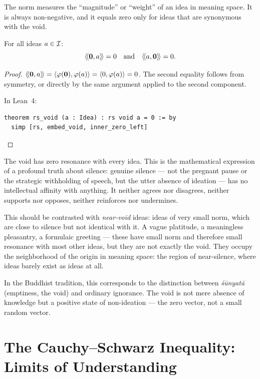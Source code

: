 The norm measures the ``magnitude'' or ``weight'' of an idea in meaning space.
It is always non-negative, and it equals zero only for ideas that are synonymous
with the void.

\begin{theorem}
\label{thm:void-zero-resonance}
For all ideas $a \in \mathcal{I}$:
\[
  \langle\!\langle \mathbf{0}, a \rangle\!\rangle = 0 \quad \text{and} \quad \langle\!\langle a, \mathbf{0} \rangle\!\rangle = 0.
\]
\end{theorem}

\begin{proof}
$\langle\!\langle \mathbf{0}, a \rangle\!\rangle = \langle \varphi(\mathbf{0}), \varphi(a) \rangle = \langle 0, \varphi(a) \rangle = 0$.
The second equality follows from symmetry, or directly by the same argument
applied to the second component.

In Lean~4:
\begin{lstlisting}
theorem rs_void (a : Idea) : rs void a = 0 := by
  simp [rs, embed_void, inner_zero_left]
\end{lstlisting}
\end{proof}

\begin{interpretation}
\label{interp:silence-resonance}
The void has zero resonance with every idea. This is the mathematical expression
of a profound truth about silence: genuine silence --- not the pregnant pause or
the strategic withholding of speech, but the utter absence of ideation --- has
no intellectual affinity with anything. It neither agrees nor disagrees,
neither supports nor opposes, neither reinforces nor undermines.

This should be contrasted with \emph{near-void} ideas: ideas of very small norm,
which are close to silence but not identical with it. A vague platitude, a
meaningless pleasantry, a formulaic greeting --- these have small norm and
therefore small resonance with most other ideas, but they are not exactly the
void. They occupy the neighborhood of the origin in meaning space: the region
of near-silence, where ideas barely exist as ideas at all.

In the Buddhist tradition, this corresponds to the distinction between
\emph{\'s\=unyat\=a} (emptiness, the void) and ordinary ignorance. The void is
not mere absence of knowledge but a positive state of non-ideation --- the zero
vector, not a small random vector.
\end{interpretation}


\section{The Cauchy--Schwarz Inequality: Limits of Understanding}

